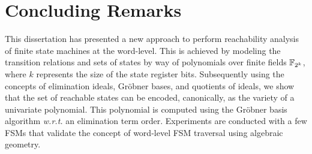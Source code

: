 
\section{Concluding Remarks} \label{sec:conc}
This dissertation has presented a new approach to perform reachability
analysis of finite state machines at the word-level. This is achieved
by modeling the transition relations and sets of states by way of
polynomials over finite fields ${\mathbb{F}}_{2^k}$, where $k$ represents the size
of the state register bits. Subsequently using the concepts of
elimination ideals, Gr\"obner bases, and quotients of ideals, we show
that the set of reachable states can be encoded, canonically, as the
variety of a univariate polynomial. This polynomial is computed using
the Gr\"obner basis algorithm {\it w.r.t.} an elimination term
order. Experiments are conducted with a few FSMs that validate the
concept of word-level FSM traversal using algebraic geometry. 
